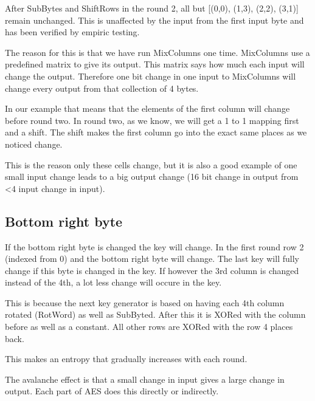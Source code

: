 After SubBytes and ShiftRows in the round 2, all but [(0,0), (1,3), (2,2), (3,1)] remain unchanged.
This is unaffected by the input from the first input byte and has been verified by empiric testing.

The reason for this is that we have run MixColumns one time.
MixColumns use a predefined matrix to give its output.
This matrix says how much each input will change the output.
Therefore one bit change in one input to MixColumns will change every output from that collection of 4 bytes.

In our example that means that the elements of the first column will change before round two.
In round two, as we know, we will get a 1 to 1 mapping first and a shift.
The shift makes the first column go into the exact same places as we noticed change.

This is the reason only these cells change, but it is also a good example of one small input change leads to a big output change (16 bit change in output from <4 input change in input).

\subsection*{Bottom right byte}

If the bottom right byte is changed the key will change.
In the first round row 2 (indexed from 0) and the bottom right byte will change.
The last key will fully change if this byte is changed in the key.
If however the 3rd column is changed instead of the 4th, a lot less change will occure in the key.

This is because the next key generator is based on having each 4th column rotated (RotWord) as well as SubByted.
After this it is XORed with the column before as well as a constant.
All other rows are XORed with the row 4 places back.

This makes an entropy that gradually increases with each round.

The avalanche effect is that a small change in input gives a large change in output.
Each part of AES does this directly or indirectly.
